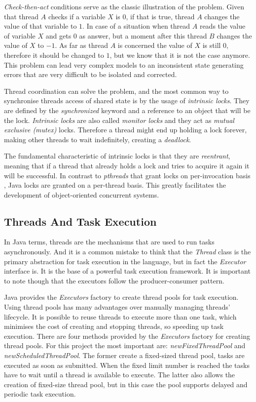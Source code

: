 \emph{Check-then-act} conditions serve as the classic illustration of the problem. Given that thread $A$ checks if a variable $X$ is $0$, if that is true, thread $A$ changes the value of that variable to $1$. In case of a situation when thread $A$ reads the value of variable $X$ and gets $0$ as answer, but a moment after this thread $B$ changes the value of $X$ to $-1$. As far as thread $A$ is concerned the value of $X$ is still $0$, therefore it should be changed to $1$, but we know that it is not the case anymore. This problem can lead very complex models to an inconsistent state generating errors that are very difficult to be isolated and corrected. 

Thread coordination can solve the problem, and the most common way to synchronise threads access of shared state is by the usage of \emph{intrinsic locks}. They are defined by the \emph{synchronized} keyword and a reference to an object that will be the lock. \emph{Intrinsic locks} are also called \emph{monitor locks} and they act as \emph{mutual exclusive (mutex)} locks. Therefore a thread might end up holding a lock forever, making other threads to wait indefinitely, creating a \emph{deadlock}. 

The fundamental characteristic of intrinsic locks is that they are \emph{reentrant}, meaning that if a thread that already holds a lock and tries to acquire it again it will be successful. In contrast to \emph{pthreads} that grant locks on per-invocation basis \cite{butenhof1997programming}, Java locks are granted on a per-thread basis. This greatly facilitates the development of object-oriented concurrent systems. \cite{goetz2006java}

\subsection{Threads And Task Execution}
\label{subsec:threads-task-exec}

In Java terms, threads are the mechanisms that are used to run tasks asynchronously. And it is a common mistake to think that the \emph{Thread} class is the primary abstraction for task execution in the language, but in fact the \emph{Executor} interface is. It is the base of a powerful task execution framework. It is important to note though that the executors follow the producer-consumer pattern.

Java provides the \emph{Executors} factory to create thread pools for task execution. Using thread pools has many advantages over manually managing threads' lifecycle. It is possible to reuse threads to execute more than one task, which minimises the cost of creating and stopping threads, so speeding up task execution. There are four methods provided by the \emph{Executors} factory for creating thread pools. For this project the most important are: \emph{newFixedThreadPool} and \emph{newScheduledThreadPool}. The former create a fixed-sized thread pool, tasks are executed as soon as submitted. When the fixed limit number is reached the tasks have to wait until a thread is available to execute. The latter also allows the creation of fixed-size thread pool, but in this case the pool supports delayed and periodic task execution.

